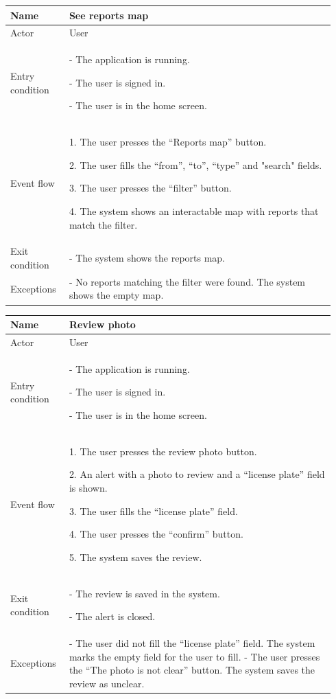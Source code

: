 \begin{table}[H]
\begin{tabular}{|p{0.17\linewidth}|p{0.77\linewidth}|}
\hline
Name            & See reports map
\\ \hline

Actor           & User
\\ \hline

Entry condition &
    - The application is running.

    - The user is signed in.

    - The user is in the home screen.
\\ \hline
Event flow      & 
    1. The user presses the “Reports map” button.

    2. The user fills the “from”, “to”, “type” and "search" fields.

    3. The user presses the “filter” button.

    4. The system shows an interactable map with reports that match the filter.
\\ \hline
Exit condition  & 
    - The system shows the reports map.
\\ \hline
Exceptions      &
    - No reports matching the filter were found. The system shows the empty map.
\\ \hline
\end{tabular}
\end{table}

\begin{table}[H]
\begin{tabular}{|p{0.17\linewidth}|p{0.77\linewidth}|}
\hline
Name            & Review photo
\\ \hline

Actor           & User
\\ \hline

Entry condition &
    - The application is running.

    - The user is signed in.

    - The user is in the home screen.
\\ \hline
Event flow      & 
    1. The user presses the review photo button.

    2. An alert with a photo to review and a “license plate” field is shown.

    3. The user fills the “license plate” field.

    4. The user presses the “confirm” button.

    5. The system saves the review.
\\ \hline
Exit condition  & 
    - The review is saved in the system.

    - The alert is closed.
\\ \hline
Exceptions      &
    - The user did not fill the “license plate” field. The system marks the empty field for the user to fill.
    - The user presses the “The photo is not clear” button. The system saves the review as unclear.
\\ \hline
\end{tabular}
\end{table}

